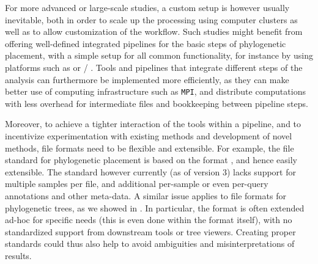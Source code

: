 For more advanced or large-scale studies, a custom setup is however usually inevitable,
both in order to scale up the processing using computer clusters as well as to allow customization of the workflow.
Such studies might benefit from offering well-defined integrated pipelines for the basic steps of phylogenetic placement,
with a simple setup for all common functionality, for instance by using platforms such as
 \cite{Afgan2018} or / \cite{Gruning2018}.
Tools and pipelines that integrate different steps of the analysis can furthermore be implemented more efficiently,
as they can make better use of computing infrastructure such as \texttt{\acs{MPI}},
and distribute computations with less overhead for intermediate files and bookkeeping between pipeline steps.


Moreover, to achieve a tighter interaction of the tools within a pipeline,
and to incentivize experimentation with existing methods and development of novel methods,
file formats need to be flexible and extensible.
For example, the  file standard for phylogenetic placement \cite{Matsen2012}
is based on the  format \cite{JsonMemo,JsonStandard}, and hence easily extensible.
The standard however currently (as of  version 3) lacks support for multiple samples per file,
and additional per-sample or even per-query annotations and other meta-data.
A similar issue applies to file formats for phylogenetic trees, as we showed in \cite{Czech2017}.
In particular, the  format is often extended ad-hoc for specific needs
(this is even done within the  format itself),
with no standardized support from downstream tools or tree viewers.
Creating proper standards could thus also help to avoid ambiguities and misinterpretations of results.

